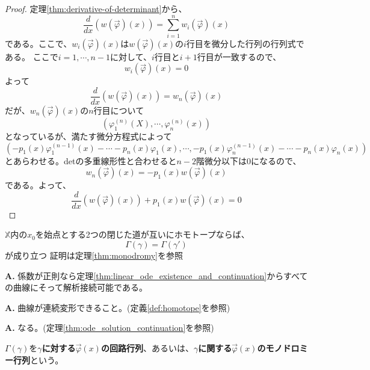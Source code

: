 \begin{proof}
    定理\ref{thm:derivative-of-determinant}から、
    \[
    \frac{d}{dx}(w(\vec{\varphi})(x))=\sum_{i=1}^{n}w_{i}(\vec{\varphi})(x)
    \]
    である。ここで、$w_{i}(\vec{\varphi})(x)$は$w(\vec{\varphi})(x)$の$i$行目を微分した行列の行列式である。
    ここで$i=1,\cdots,n-1$に対して、$i$行目と$i+1$行目が一致するので、
    \[
    w_{i}(\vec{\varphi})(x)=0
    \]
    よって
    \[
    \frac{d}{dx}(w(\vec{\varphi})(x))=w_{n}(\vec{\varphi})(x)
    \]
    だが、$w_{n}(\vec{\varphi})(x)$の$n$行目について
    \[
    (\varphi_{1}^{(n)}(X),\cdots,\varphi_{n}^{(n)}(x))
    \]
    となっているが、満たす微分方程式によって
    \[
    (-p_{1}(x)\varphi_{1}^{(n-1)}(x)-\cdots-p_{n}(x)\varphi_{1}(x),\cdots,-p_{1}(x)\varphi_{n}^{(n-1)}(x)-\cdots-p_{n}(x)\varphi_{n}(x))
    \]
    とあらわせる。detの多重線形性と合わせると$n-2$階微分以下は0になるので、
    \[
    w_{n}(\vec{\varphi})(x)=-p_{1}(x)w(\vec{\varphi})(x)
    \]
    である。よって、
    \[
    \frac{d}{dx}(w(\vec{\varphi})(x))+p_{1}(x)w(\vec{\varphi})(x)=0
    \]
\end{proof}

\begin{proposition}
$\mathbb{X}$内の$x_{0}$を始点とする2つの閉じた道が互いにホモトープならば、
\[
\Gamma(\gamma)=\Gamma(\gamma ')
\]
が成り立つ
証明は定理\ref{thm:monodromy}を参照
\end{proposition}

\begin{Q}[一価性定理の仮定は満たしてるの？]
\textbf{A.} 係数が正則なら定理\ref{thm:linear_ode_existence_and_continuation}からすべての曲線にそって解析接続可能である。\\
\end{Q}

\begin{Q}[ホモトープって何？]
\textbf{A.} 曲線が連続変形できること。(定義\ref{def:homotope}を参照)\\
\end{Q}

\begin{Q}[解を解析接続したものも解になるの？]
\textbf{A.} なる。(定理\ref{thm:ode_solution_continuation}を参照)\\
\end{Q}

\begin{definition}[モノドロミー行列]
    $\Gamma(\gamma)$を\textbf{$\gamma$に対する$\vec{\varphi}(x)$の回路行列}、あるいは、\textbf{$\gamma$に関する$\vec{\varphi}(x)$のモノドロミー行列}という。
\end{definition}

